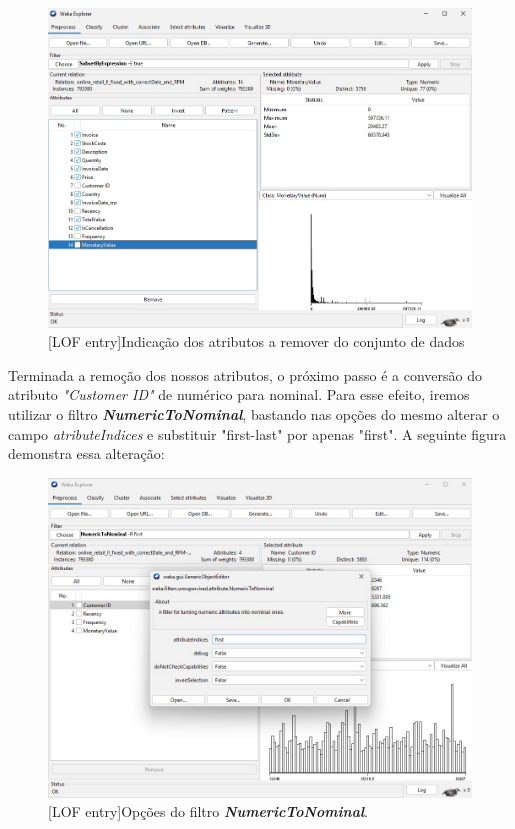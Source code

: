 \documentclass{easychair}
\begin{document}
\begin{figure}[H]
    \begin{centering}
    \includegraphics[width=1\linewidth]{imagens/figure3.jpg}\label{cap-2-fig3}
    [LOF entry]{Indicação dos atributos a remover do conjunto de dados}
    \label{fig3}
    \end{centering}
\end{figure}

Terminada a remoção dos nossos atributos, o próximo passo é a conversão do atributo \textit{"Customer ID"} de numérico para nominal. Para esse efeito, iremos utilizar o filtro \textit{\textbf{NumericToNominal}}, bastando nas opções do mesmo alterar o campo \textit{atributeIndices} e substituir "first-last" por apenas "first". A seguinte figura demonstra essa alteração:

\vspace{-0.2cm}
\begin{figure}[H]
    \begin{centering}
    \includegraphics[width=1\linewidth]{imagens/figure4.jpg}\label{cap-2-fig4}
    [LOF entry]{Opções do filtro \textbf{\textit{NumericToNominal}}.}
    \label{fig4}
    \end{centering}
\end{figure}
\end{document}
